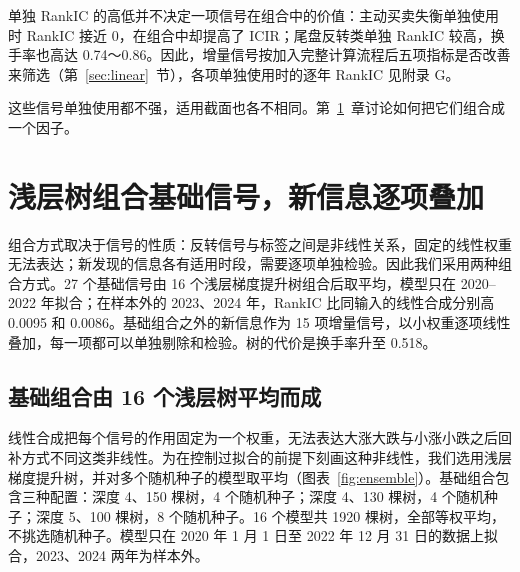 \documentclass[UTF8,a4paper,zihao=-4,fontset=none]{ctexart}
\begin{document}
单独 RankIC 的高低并不决定一项信号在组合中的价值：主动买卖失衡单独使用时 RankIC 接近 0，在组合中却提高了 ICIR；尾盘反转类单独 RankIC 较高，换手率也高达 0.74～0.86。因此，增量信号按加入完整计算流程后五项指标是否改善来筛选（第~\ref{sec:linear}~节），各项单独使用时的逐年 RankIC 见附录 G。

这些信号单独使用都不强，适用截面也各不相同。第~\ref{sec:ch3}~章讨论如何把它们组合成一个因子。

\section{浅层树组合基础信号，新信息逐项叠加}\label{sec:ch3}

组合方式取决于信号的性质：反转信号与标签之间是非线性关系，固定的线性权重无法表达；新发现的信息各有适用时段，需要逐项单独检验。因此我们采用两种组合方式。27 个基础信号由 16 个浅层梯度提升树组合后取平均，模型只在 2020–2022 年拟合；在样本外的 2023、2024 年，RankIC 比同输入的线性合成分别高 0.0095 和 0.0086。基础组合之外的新信息作为 15 项增量信号，以小权重逐项线性叠加，每一项都可以单独剔除和检验。树的代价是换手率升至 0.518。

\subsection{基础组合由 16 个浅层树平均而成}\label{sec:tree}

线性合成把每个信号的作用固定为一个权重，无法表达大涨大跌与小涨小跌之后回补方式不同这类非线性。为在控制过拟合的前提下刻画这种非线性，我们选用浅层梯度提升树，并对多个随机种子的模型取平均（图表~\ref{fig:ensemble}）。基础组合包含三种配置：深度 4、150 棵树，4 个随机种子；深度 4、130 棵树，4 个随机种子；深度 5、100 棵树，8 个随机种子。16 个模型共 1920 棵树，全部等权平均，不挑选随机种子。模型只在 2020 年 1 月 1 日至 2022 年 12 月 31 日的数据上拟合，2023、2024 两年为样本外。
\end{document}

